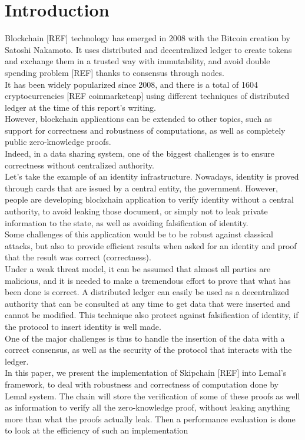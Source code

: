 \documentclass{article}
\begin{document}
\newpage

\tableofcontents

\newpage

\section{Introduction}
Blockchain [REF] technology has emerged in 2008 with the Bitcoin creation by Satoshi Nakamoto. It uses distributed and decentralized ledger to create tokens and exchange them in a trusted way with immutability, and avoid double spending problem [REF] thanks to consensus through nodes.\\
It has been widely popularized since 2008, and there is a total of 1604 cryptocurrencies [REF coinmarketcap] using different techniques of distributed ledger at the time of this report's writing.\\
However, blockchain applications can be extended to other topics, such as support for correctness and robustness of computations, as well as completely public zero-knowledge proofs.\\
Indeed, in a data sharing system, one of the biggest challenges is to ensure correctness without centralized authority.\\
Let's take the example of an identity infrastructure. Nowadays, identity is proved through cards that are issued by a central entity, the government. However, people are developing blockchain application to verify identity without a central authority, to avoid leaking those document, or simply not to leak private information to the state, as well as avoiding falsification of identity.\\ 
Some challenges of this application would be to be robust against classical attacks, but also to provide efficient results when asked for an identity and proof that the result was correct (correctness).\\
Under a weak threat model, it can be assumed that almost all parties are malicious, and it is needed to make a tremendous effort to prove that what has been done is correct. A distributed ledger can easily be used as a decentralized authority that can be consulted at any time to get data that were inserted and cannot be modified. This technique also protect against falsification of identity, if the protocol to insert identity is well made.\\
One of the major challenges is thus to handle the insertion of the data with a correct consensus, as well as the security of the protocol that interacts with the ledger.\\
In this paper, we present the implementation of Skipchain [REF] into Lemal's framework, to deal with robustness and correctness of computation done by Lemal system. The chain will store the verification of some of these proofs as well as information to verify all the zero-knowledge proof, without leaking anything more than what the proofs actually leak. Then a performance evaluation is done to look at the efficiency of such an implementation
\end{document}

